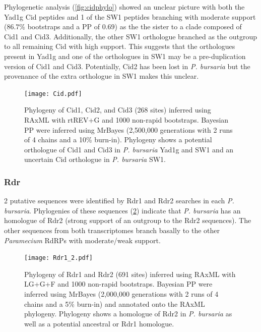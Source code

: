Phylogenetic analysis (\cref{fig:cidphylo}) showed an unclear
picture with both the Yad1g Cid peptides and 1 of the SW1 peptides
branching with moderate support (\(86.7\%\) bootstraps and
a PP of \(0.69\)) as the the sister to a 
clade composed of Cid1 and Cid3.  Additionally, the other
SW1 orthologue branched as the outgroup to all remaining Cid
with high support. 
This suggests that the orthologues present in Yad1g and one of
the orthologues in SW1 may be a pre-duplication version of Cid1
and Cid3.  Potentially, Cid2 has been lost in \textit{P. bursaria}
but the provenance of the extra orthologue in SW1 makes this
unclear.

\begin{figure}
    \texttt{[image: Cid.pdf]}
    \caption[Cid Phylogeny]{
        Phylogeny of Cid1, Cid2, and Cid3 (268 sites) inferred
        using RAxML with rtREV+G and 1000 non-rapid bootstraps.
        Bayesian PP were inferred using MrBayes (2,500,000 generations 
        with 2 runs of 4 chains and a 10\% burn-in).  Phylogeny
        shows a potential orthologue of Cid1 and Cid3 in \textit{P. bursaria}
        Yad1g and SW1 and an uncertain Cid orthologue in \textit{P. bursaria}
        SW1.}
    \label{fig:cidphlyo}
\end{figure}

\subsubsection{Rdr}

2 putative sequences were identified by Rdr1 and Rdr2 searches in each
\textit{P. bursaria}.  Phylogenies of these sequences (\cref{fig:rdr12_phylo})
indicate that \textit{P. bursaria} has an homologue of
Rdr2 (strong support of an outgroup to the Rdr2 sequences).
The other sequences from both transcriptomes branch basally
to the other \textit{Paramecium} RdRPs with moderate/weak support.

\begin{figure}
    \texttt{[image: Rdr1\_2.pdf]}
    \caption[Rdr1 and Rdr2 Phylogeny]{Phylogeny of Rdr1 and Rdr2
        (691 sites) inferred using RAxML with LG+G+F and 1000
        non-rapid bootstraps.  Bayesian PP were inferred using MrBayes
        (2,000,000 generations with 2 runs of 4 chains and a 5\% burn-in)
        and annotated onto the RAxML phylogeny. Phylogeny
        shows a homologue of Rdr2 in \textit{P. bursaria} as well
    as a potential ancestral or Rdr1 homologue.}
    \label{fig:rdr12_phylo}
\end{figure}

